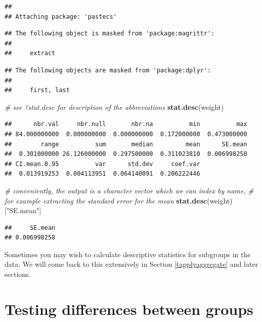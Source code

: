 \documentclass[]{book}
\newenvironment{Shaded}{\begin{snugshade}}{\end{snugshade}}
\newcommand{\CommentTok}[1]{\textcolor[rgb]{0.56,0.35,0.01}{\textit{#1}}}
\newcommand{\KeywordTok}[1]{\textcolor[rgb]{0.13,0.29,0.53}{\textbf{#1}}}
\newcommand{\NormalTok}[1]{#1}
\newcommand{\StringTok}[1]{\textcolor[rgb]{0.31,0.60,0.02}{#1}}
\begin{document}
\begin{verbatim}
## 
## Attaching package: 'pastecs'
\end{verbatim}

\begin{verbatim}
## The following object is masked from 'package:magrittr':
## 
##     extract
\end{verbatim}

\begin{verbatim}
## The following objects are masked from 'package:dplyr':
## 
##     first, last
\end{verbatim}

\begin{Shaded}
\begin{Highlighting}[]
\CommentTok{# see ?stat.desc for description of the abbreviations}
\KeywordTok{stat.desc}\NormalTok{(weight)}
\end{Highlighting}
\end{Shaded}

\begin{verbatim}
##      nbr.val     nbr.null       nbr.na          min          max 
## 84.000000000  0.000000000  0.000000000  0.172000000  0.473000000 
##        range          sum       median         mean      SE.mean 
##  0.301000000 26.126000000  0.297500000  0.311023810  0.006998258 
## CI.mean.0.95          var      std.dev     coef.var 
##  0.013919253  0.004113951  0.064140091  0.206222446
\end{verbatim}

\begin{Shaded}
\begin{Highlighting}[]
\CommentTok{# conveniently, the output is a character vector which we can index by name,}
\CommentTok{# for example extracting the standard error for the mean}
\KeywordTok{stat.desc}\NormalTok{(weight)[}\StringTok{"SE.mean"}\NormalTok{]}
\end{Highlighting}
\end{Shaded}

\begin{verbatim}
##     SE.mean 
## 0.006998258
\end{verbatim}

Sometimes you may wish to calculate descriptive statistics for subgroups in the data. We will come back to this extensively in Section \ref{tapplyaggregate} and later sections.

\hypertarget{testing-differences-between-groups}{%
\section{Testing differences between groups}\label{testing-differences-between-groups}}
\end{document}
